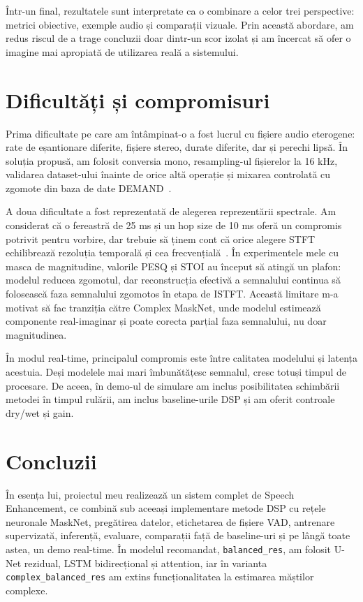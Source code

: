 \documentclass[12pt,a4paper]{report}
\begin{document}
\FloatBarrier

Într-un final, rezultatele sunt interpretate ca o combinare a celor 
trei perspective: metrici obiective, exemple audio și comparații 
vizuale. Prin această abordare, am redus riscul de a trage concluzii 
doar dintr-un scor izolat și am încercat să ofer o imagine mai 
apropiată de utilizarea reală a sistemului.

\section{Dificultăți și compromisuri}

Prima dificultate pe care am întâmpinat-o a fost lucrul cu fișiere audio 
eterogene: rate de eșantionare diferite, fișiere stereo, durate 
diferite, dar și perechi lipsă. În soluția propusă, am folosit 
conversia mono, resampling-ul fișierelor la 16 kHz, validarea 
dataset-ului înainte de orice altă operație și mixarea controlată cu 
zgomote din baza de date DEMAND~\cite{demand}.

A doua dificultate a fost reprezentată de alegerea reprezentării spectrale. 
Am considerat că o fereastră de 25 ms și un hop size de 10 ms oferă un
compromis potrivit pentru vorbire, dar trebuie să ținem cont că orice 
alegere STFT echilibrează rezoluția temporală și cea frecvențială~\cite{stft}. 
În experimentele mele cu masca de magnitudine, valorile PESQ și STOI 
au început să atingă un plafon: modelul reducea zgomotul, dar 
reconstrucția efectivă a semnalului continua să folosească faza 
semnalului zgomotos în etapa de ISTFT. Această limitare m-a motivat 
să fac tranziția către Complex MaskNet, unde modelul estimează 
componente real-imaginar și poate corecta parțial faza semnalului, 
nu doar magnitudinea.

În modul real-time, principalul compromis este între calitatea 
modelului și latența acestuia. Deși modelele mai mari îmbunătățesc 
semnalul, cresc totuși timpul de procesare. De aceea, în demo-ul de 
simulare am inclus posibilitatea schimbării metodei în timpul rulării, 
am inclus baseline-urile DSP și am oferit controale dry/wet și gain. 

\section{Concluzii}

În esența lui, proiectul meu realizează un sistem complet de Speech 
Enhancement, ce combină sub aceeași implementare metode DSP cu rețele 
neuronale MaskNet, pregătirea datelor, etichetarea de fișiere VAD, 
antrenare supervizată, inferență, evaluare, comparații față de 
baseline-uri și pe lângă toate astea, un demo real-time. În modelul 
recomandat, \texttt{balanced\_res}, am folosit U-Net rezidual, LSTM bidirecțional
și attention, iar în varianta \texttt{complex\_balanced\_res} am extins funcționalitatea 
la estimarea măștilor complexe.
\end{document}
